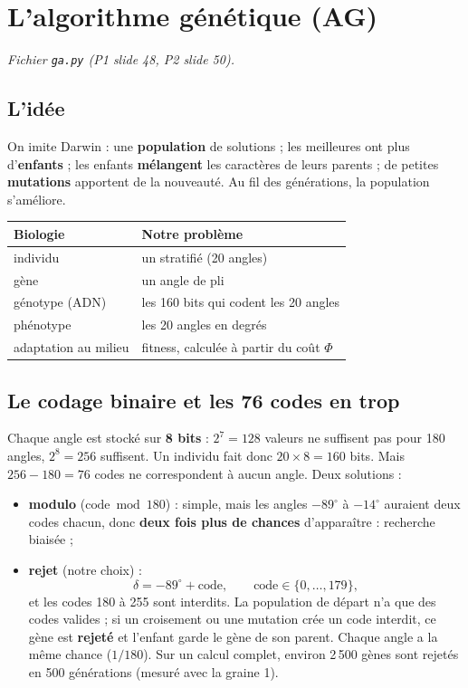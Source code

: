 \documentclass[11pt,a4paper]{article}
\newcommand{\code}[1]{\texttt{#1}}
\begin{document}
\section{L'algorithme génétique (AG)}
\emph{Fichier \code{ga.py} (P1 slide 48, P2 slide 50).}

\subsection{L'idée}
On imite Darwin : une \textbf{population} de solutions ; les meilleures ont
plus d'\textbf{enfants} ; les enfants \textbf{mélangent} les caractères de
leurs parents ; de petites \textbf{mutations} apportent de la nouveauté. Au
fil des générations, la population s'améliore.
\begin{center}
\begin{tabular}{l l}
\toprule
Biologie & Notre problème\\
\midrule
individu & un stratifié (20 angles)\\
gène & un angle de pli\\
génotype (ADN) & les 160 bits qui codent les 20 angles\\
phénotype & les 20 angles en degrés\\
adaptation au milieu & fitness, calculée à partir du coût $\Phi$\\
\bottomrule
\end{tabular}
\end{center}

\subsection{Le codage binaire et les 76 codes en trop}
Chaque angle est stocké sur \textbf{8 bits} : $2^7 = 128$ valeurs ne
suffisent pas pour 180 angles, $2^8 = 256$ suffisent. Un individu fait donc
$20\times8 = 160$ bits. Mais $256 - 180 = 76$ codes ne correspondent à aucun
angle. Deux solutions :
\begin{itemize}
  \item \textbf{modulo} ($\text{code} \bmod 180$) : simple, mais les angles
        $-89^\circ$ à $-14^\circ$ auraient deux codes chacun, donc
        \textbf{deux fois plus de chances} d'apparaître : recherche biaisée ;
  \item \textbf{rejet} (notre choix) :
        \[
        \delta = -89^\circ + \text{code},\qquad \text{code}\in\{0,\dots,179\},
        \]
        et les codes 180 à 255 sont interdits. La population de départ n'a
        que des codes valides ; si un croisement ou une mutation crée un code
        interdit, ce gène est \textbf{rejeté} et l'enfant garde le gène de
        son parent. Chaque angle a la même chance ($1/180$). Sur un calcul
        complet, environ 2\,500 gènes sont rejetés en 500 générations
        (mesuré avec la graine 1).
\end{itemize}
\end{document}

